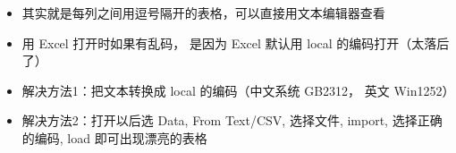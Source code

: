 

\begin{issues}
\issueDraft
\end{issues}

\begin{itemize}
\item 其实就是每列之间用逗号隔开的表格，可以直接用文本编辑器查看
\item 用 Excel 打开时如果有乱码， 是因为 Excel 默认用 local 的编码打开（太落后了）
\item 解决方法1：把文本转换成 local 的编码（中文系统 GB2312， 英文 Win1252）
\item 解决方法2：打开以后选 Data, From Text/CSV, 选择文件, import, 选择正确的编码, load 即可出现漂亮的表格
\end{itemize}

